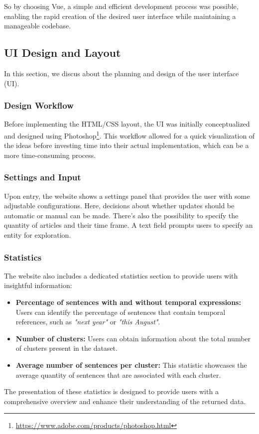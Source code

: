 \documentclass[12pt,oneside,bibtotoc,liststotoc]{scrbook}
\begin{document}
So by choosing Vue, a simple and efficient development process was possible, enabling the rapid creation of the desired user interface while maintaining a manageable codebase.

\subsection{UI Design and Layout}
In this section, we discus about the planning and design of the user interface (UI).

\subsubsection{Design Workflow}
Before implementing the HTML/CSS layout, the UI was initially conceptualized and designed using Photoshop\footnote{\url{https://www.adobe.com/products/photoshop.html}}. This workflow allowed for a quick visualization of the ideas before investing time into their actual implementation, which can be a more time-consuming process.


\subsubsection{Settings and Input}
Upon entry, the website shows a settings panel that provides the user with some adjustable configurations. Here, decisions about whether updates should be automatic or manual can be made. There’s also the possibility to specify the quantity of articles and their time frame. A text field prompts users to specify an entity for exploration.

\subsubsection{Statistics}
The website also includes a dedicated statistics section to provide users with insightful information:

\begin{itemize}
  \item \textbf{Percentage of sentences with and without temporal expressions:} Users can identify the percentage of sentences that contain temporal references, such as \textit{"next year"} or \textit{"this August"}.
  \item \textbf{Number of clusters:} Users can obtain information about the total number of clusters present in the dataset.
  \item \textbf{Average number of sentences per cluster:} This statistic showcases the average quantity of sentences that are associated with each cluster.
\end{itemize}
The presentation of these statistics is designed to provide users with a comprehensive overview and enhance their understanding of the returned data.
\end{document}
